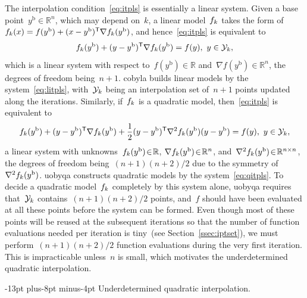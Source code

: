 \documentclass[
    smallextended,  %
    final,          %
]{svjour3}
\makeatletter
\newcommand{\R}{\mathbb{R}}
\newcommand{\T}{\mathsf{T}}
\newcommand{\base}{{\text{b}}}
\newcommand{\objm}[1][k]{\obj\ifthenelse{\equal{#1}{}}{}{_{#1}}}
\newcommand{\obj}{f}
\newcommand{\xpt}[1][k]{\mathcal{Y}\ifthenelse{\equal{#1}{}}{}{_{#1}}}
\def\paragraph{\@startsection{paragraph}{4}{\z@}%
    {-13pt plus-8pt minus-4pt}{\z@}
    {\normalsize\bfseries}}
\makeatother
\begin{document}
The interpolation condition~\eqref{eq:itpls} is essentially a linear system.
Given a base point~$y^{\base}\in \R^n$, which may depend on~$k$, a linear model~$\objm$ takes the form of~$\objm(x) = \obj(y^{\base}) + (x - y^{\base})^{\T} \nabla \objm(y^{\base})$, and hence~\eqref{eq:itpls} is equivalent to
\begin{equation}
    \label{eq:litpls}
    \objm(y^{\base}) + (y -y^{\base})^{\T} \nabla \objm(y^{\base}) = \obj(y), ~ y \in \xpt,
\end{equation}
which is a linear system with respect to~$\obj(y^\base) \in \R$ and~$\nabla \obj(y^\base) \in \R^n$, the degrees of freedom being~$n + 1$.
\Gls{cobyla} builds linear models by the system~\eqref{eq:litpls}, with~$\xpt$ being an interpolation set of~$n+1$ points updated along the iterations.
Similarly, if~$\objm$ is a quadratic model, then~\eqref{eq:itpls} is equivalent to
\begin{equation}
    \label{eq:qitpls}
    \objm(y^{\base}) + (y -y^{\base})^{\T} \nabla \objm(y^{\base}) + \frac{1}{2}(y-y^{\base})^{\T} \nabla^2 \objm(y^{\base}) (y-y^{\base}) = \obj(y), ~ y \in \xpt,
\end{equation}
a linear system with unknowns~$\objm(y^\base) \! \in \! \R$, $\nabla \objm(y^\base) \! \in \! \R^n$, and~$\nabla^2 \objm(y^{\base}) \! \in \! \R^{n \times n}$, the degrees of freedom being~$(n + 1)(n + 2) / 2$ due to the symmetry of~$\nabla^2 \objm(y^\base)$.
\Gls{uobyqa} constructs quadratic models by the system~\eqref{eq:qitpls}.
To decide a quadratic model~$\objm$ completely by this system alone, \gls{uobyqa} requires that~$\xpt$ contains~$(n+1)(n+2)/2$ points, and~$f$ should have been evaluated at all these points before the system can be formed.
Even though most of these points will be reused at the subsequent iterations so that the number of function evaluations needed per iteration is tiny~(see Section~\ref{ssec:iptset}), we must perform~$(n + 1)(n + 2) / 2$ function evaluations during the very first iteration.
This is impracticable unless~$n$ is small, which motivates the underdetermined quadratic interpolation.

\paragraph{Underdetermined quadratic interpolation.}
\end{document}

